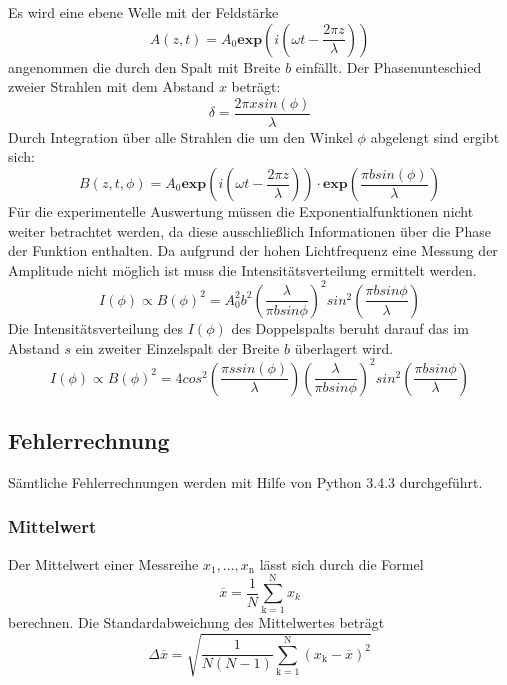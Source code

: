 Es wird eine ebene Welle mit der Feldstärke
\begin{equation}
  A(z,t)= A_0 \textbf{exp} \left( i \left( \omega t - \frac{2 \pi z}{\lambda}   \right) \right)
  \label{eqn:welle}
\end{equation}
angenommen die durch den Spalt mit Breite $b$ einfällt. Der Phasenunteschied zweier Strahlen mit dem Abstand $x$ beträgt:
\begin{equation}
  \delta = \frac{2 \pi x sin(\phi)}{\lambda}
  \label{eqn:phase}
\end{equation}
Durch Integration über alle Strahlen die um den Winkel $\phi$ abgelengt sind ergibt sich:
\begin{equation}
  B(z,t,\phi) = A_0 \textbf{exp} \left( i \left( \omega t - \frac{2 \pi z}{\lambda} \right) \right) \cdot \textbf{exp} \left( \frac{\pi b sin(\phi)}{\lambda} \right)
  \label{}
\end{equation}
Für die experimentelle Auswertung müssen die Exponentialfunktionen nicht weiter betrachtet werden, da diese ausschließlich Informationen über die Phase der Funktion enthalten. Da aufgrund der hohen Lichtfrequenz eine Messung der Amplitude nicht möglich ist muss die Intensitätsverteilung  ermittelt werden.
\begin{equation}
  I(\phi) \propto B(\phi)^2 = A_0^2 b^2 \left( \frac{\lambda}{\pi b sin \phi} \right)^2 sin^2 \left( \frac{\pi b sin \phi}{\lambda} \right)
  \label{eqn:I}
\end{equation}
Die Intensitätsverteilung des $I(\phi)$ des Doppelspalts beruht darauf das im Abstand $s$ ein zweiter Einzelspalt der Breite $b$ überlagert wird.
\begin{equation}
  I(\phi) \propto B(\phi)^2 = 4cos^2\left( \frac{\pi s sin(\phi)}{\lambda} \right) \left( \frac{\lambda}{\pi b sin \phi} \right)^2 sin^2 \left( \frac{\pi b sin \phi}{\lambda} \right)
  \label{eqn:Id}
\end{equation}

\subsection{Fehlerrechnung}
Sämtliche Fehlerrechnungen werden mit Hilfe von Python 3.4.3 durchgeführt.
\subsubsection{Mittelwert}
Der Mittelwert einer Messreihe $x_\text{1}, ... ,x_\text{n}$ lässt sich durch die Formel
\begin{equation}
	\overline{x} = \frac{1}{N} \sum_{\text{k}=1}^\text{N} x_k
	\label{eqn:ave}
\end{equation}
berechnen. Die Standardabweichung des Mittelwertes beträgt
\begin{equation}
	\Delta \overline{x} = \sqrt{ \frac{1}{N(N-1)} \sum_{\text{k}=1}^\text{N} (x_\text{k} - \overline{x})^2}
	\label{eqn:std}
\end{equation}

